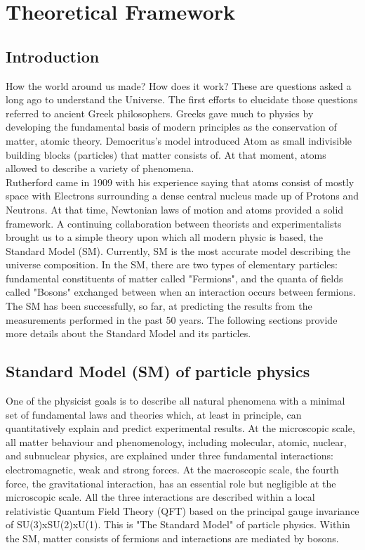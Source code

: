 \newpage
\chapter{Theoretical Framework}
\label{chap1}
\section{Introduction}
\label{chap1:intro}
How the world around us made? How does it work? These are questions asked a long ago to understand the Universe. The first efforts to elucidate those questions referred to ancient Greek philosophers. Greeks gave much to physics by developing the fundamental basis of modern principles as the conservation of matter, atomic theory. Democritus's model introduced Atom as small indivisible building blocks (particles) that matter consists of. At that moment, atoms allowed to describe a variety of phenomena. \\
Rutherford came in 1909 with his experience saying that atoms consist of mostly space with Electrons surrounding a dense central nucleus made up of Protons and Neutrons. At that time, Newtonian laws of motion and atoms provided a solid framework. A continuing collaboration between theorists and experimentalists brought us to a simple theory upon which all modern physic is based, the Standard Model (SM). Currently, SM is the most accurate model describing the universe composition. In the SM, there are two types of elementary particles: fundamental constituents of matter called "Fermions", and the quanta of fields called "Bosons" exchanged between when an interaction occurs between fermions. The SM has been successfully, so far, at predicting the results from the measurements performed in the past 50 years. The following sections provide more details about the Standard Model and its particles.

\section{Standard Model (SM) of particle physics}
\label{chap1:SM}
One of the physicist goals is to describe all natural phenomena with a minimal set of fundamental laws and theories which, at least in principle, can quantitatively explain and predict experimental results. At the microscopic scale, all matter behaviour and phenomenology, including molecular, atomic, nuclear, and subnuclear physics, are explained under three fundamental interactions: electromagnetic, weak and strong forces. At the macroscopic scale, the fourth force, the gravitational interaction, has an essential role but negligible at the microscopic scale. All the three interactions are described within a local relativistic Quantum Field Theory (QFT) based on the principal gauge invariance of SU(3)xSU(2)xU(1). This is "The Standard Model" of particle physics. Within the SM, matter consists of fermions and interactions are mediated by bosons. 


